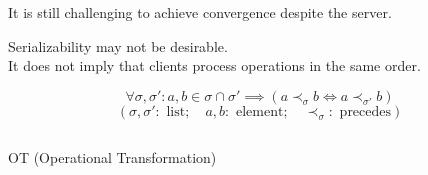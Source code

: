 
\appendix

\begin{frame}{}
  \centerline{}
\end{frame}

\begin{frame}{}
  \centerline{It is still challenging to achieve convergence despite the server.}
  

  \begin{center}
    Serializability may not be desirable. \\[6pt]
    It does not imply that clients process operations in the same order.
  \end{center}
\end{frame}

\begin{frame}{}
  \[
    \forall \sigma, \sigma': a, b \in \sigma \cap \sigma' \implies (a \prec_{\sigma} b \iff a \prec_{\sigma'} b)
  \]
  \[
    (\sigma, \sigma': \text{ list}; \quad a, b: \text{ element}; \quad \prec_{\sigma}: \text{ precedes})
  \]

  \begin{columns}
      \vspace{-0.60cm}
      \vspace{-0.60cm}
  \end{columns}
\end{frame}

\begin{frame}{}
  \centerline{OT (Operational Transformation)~}

  \begin{columns}
      \begin{center}
	
      \end{center}
      \begin{center}
	
      \end{center}
  \end{columns}
\end{frame}

